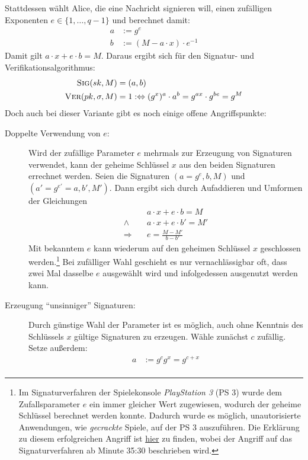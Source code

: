 Stattdessen wählt Alice, die eine Nachricht signieren will, einen
zufälligen Exponenten $e \in \{1, \dots, q - 1\}$ und berechnet damit: 
\begin{align*}
a &:= g^e\\
b &:= (M - a \cdot x) \cdot e^{-1}
\end{align*}
Damit gilt $a \cdot x + e \cdot b = M$.
Daraus ergibt sich für den Signatur- und Verifikationsalgorithmus:
\begin{align*}
\textsc{Sig}(sk,M) &= (a, b)\\
\textsc{Ver}(pk,\sigma,M) &= 1 :\Leftrightarrow (g^x)^a \cdot a^b = g^{ax} \cdot g^{be} = g^M
\end{align*}
Doch auch bei dieser Variante gibt es noch einige offene Angriffspunkte:
\begin{description}
	\item[Doppelte Verwendung von $e$:]
	Wird der zufällige Parameter $e$ mehrmals zur Erzeugung von Signaturen verwendet, kann der geheime Schlüssel $x$ aus den beiden Signaturen errechnet werden. Seien die Signaturen $(a = g^e, b, M)$ und $(a' = g^{e'} = a, b', M')$. Dann ergibt sich durch Aufaddieren und Umformen
	der Gleichungen
	\begin{align*}
	&a \cdot x + e \cdot b = M\\
	\land \quad &a \cdot x + e \cdot b' = M'\\
	\Rightarrow \quad &e = \frac{M - M'}{b - b'}
	\end{align*}
	Mit bekanntem $e$ kann wiederum auf den geheimen Schlüssel $x$ geschlossen werden.\footnote{Im Signaturverfahren der Spielekonsole \textit{PlayStation 3} (PS 3) wurde dem Zufallsparameter $e$ ein immer gleicher Wert zugewiesen, wodurch der geheime Schlüssel berechnet werden konnte. Dadurch wurde es möglich, unautorisierte Anwendungen, wie \textit{gecrackte} Spiele, auf der PS 3 auszuführen. Die Erklärung zu diesem erfolgreichen Angriff ist \href{https://www.youtube.com/watch?v=4loZGYqaZ7I}{hier} zu finden, wobei der Angriff auf das Signaturverfahren ab Minute 35:30 beschrieben wird.} Bei zufälliger Wahl geschieht es nur vernachlässigbar oft, dass zwei Mal dasselbe $e$ ausgewählt wird und infolgedessen ausgenutzt werden kann.
	\item[Erzeugung "`unsinniger"' Signaturen:]
	Durch günstige Wahl der Parameter ist es möglich, auch ohne Kenntnis des Schlüssels $x$ gültige Signaturen zu erzeugen. Wähle zunächst $c$
	zufällig. Setze außerdem:
	\begin{align*}
	a &:= g^cg^x = g^{c+x}\\

\end{align*}
\end{description}
